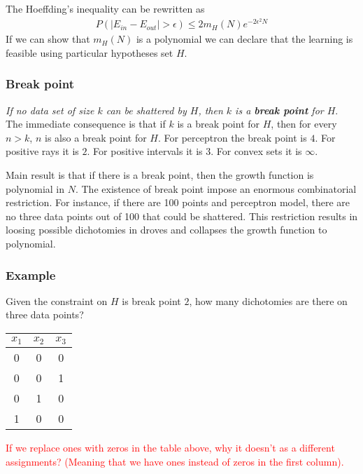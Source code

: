 \documentclass[../../main.tex]{subfiles}
\numberwithin{equation}{section}
\begin{document}
The Hoeffding's inequality can be rewritten as
\begin{align}
    P(|E_{in}-E_{out}|>\epsilon)\leq 2m_H(N)e^{-2\epsilon^2 N}
\end{align}
If we can show that $m_H(N)$ is a polynomial we can declare that the learning is feasible using particular hypotheses set $H$.
\subsubsection{Break point}
\textit{If no data set of size $k$ can be shattered by $H$, then $k$ is a \textbf{break point} for $H$}.
The immediate consequence is that if $k$ is a break point for $H$, then for every $n>k$, $n$ is also a break point for $H$.
For perceptron the break point is $4$. For positive rays it is $2$. For positive intervals it is $3$. For convex sets it is $\infty$.

Main result is that if there is a break point, then the growth function is polynomial in $N$. The existence of break point impose an enormous combinatorial restriction. For instance, if there are 100 points and perceptron model, there are no three data points out of 100 that could be shattered. This restriction results in loosing possible dichotomies in droves and collapses the growth function to polynomial.
\subsubsection*{Example}
Given the constraint on $H$ is break point $2$, how many dichotomies are there on three data points?
\begin{center}
\begin{tabular}{| c | c | c | }
 \hline
 $x_1$ & $x_2$ & $x_3$  \\ \hline 
 0 & 0 & 0 \\ \hline
 0 & 0 & 1 \\ \hline
 0 & 1 & 0 \\ \hline
 1 & 0 & 0 \\ \hline
\end{tabular}
\end{center}
\textcolor{red}{If we replace ones with zeros in the table above, why it doesn't as a different assignments? (Meaning that we have ones instead of zeros in the first column).}

\end{document}
